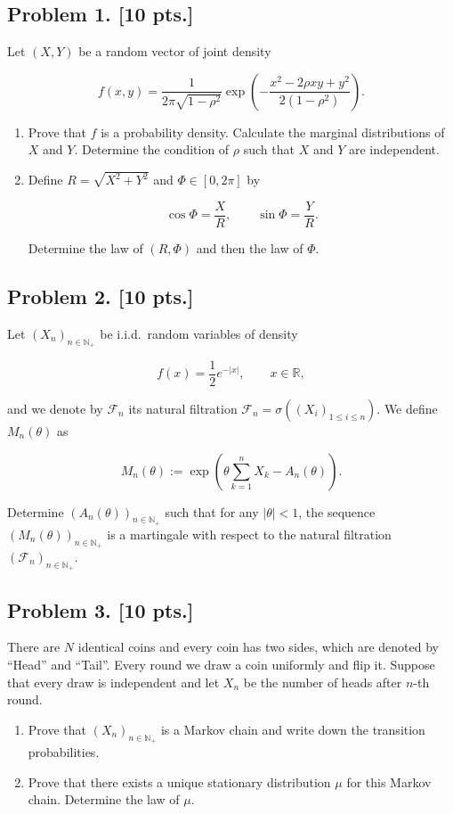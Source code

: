 \documentclass[11pt,a4paper]{article}
\begin{document}
\subsection{Problem 1. [10 pts.]}
Let \( (X, Y) \) be a random vector of joint density

\[
f(x, y) = \frac{1}{2\pi \sqrt{1 - \rho^2}} \exp\left( -\frac{x^2 - 2\rho xy + y^2}{2(1 - \rho^2)} \right).
\]

\begin{enumerate}[label=(\alph*)]
    \item Prove that \( f \) is a probability density. Calculate the marginal distributions of \( X \) and \( Y \). Determine the condition of \( \rho \) such that \( X \) and \( Y \) are independent.
    \item Define \( R = \sqrt{X^2 + Y^2} \) and \( \Phi \in [0, 2\pi] \) by

    \[
    \cos \Phi = \frac{X}{R}, \qquad \sin \Phi = \frac{Y}{R}.
    \]

    Determine the law of \( (R, \Phi) \) and then the law of \( \Phi \).
\end{enumerate}

\subsection{Problem 2. [10 pts.]}
Let \( (X_n)_{n \in \mathbb{N}_+} \) be i.i.d.\ random variables of density

\[
f(x) = \frac{1}{2} e^{-|x|}, \qquad x \in \mathbb{R},
\]

and we denote by \( \mathcal{F}_n \) its natural filtration \( \mathcal{F}_n = \sigma((X_i)_{1 \le i \le n}) \). We define \( M_n(\theta) \) as

\[
M_n(\theta) := \exp\left( \theta \sum_{k=1}^n X_k - A_n(\theta) \right).
\]

Determine \( (A_n(\theta))_{n \in \mathbb{N}_+} \) such that for any \( |\theta| < 1 \), the sequence \( (M_n(\theta))_{n \in \mathbb{N}_+} \) is a martingale with respect to the natural filtration \( (\mathcal{F}_n)_{n \in \mathbb{N}_+} \).

\subsection{Problem 3. [10 pts.]}
There are \( N \) identical coins and every coin has two sides, which are denoted by ``Head'' and ``Tail''. Every round we draw a coin uniformly and flip it. Suppose that every draw is independent and let \( X_n \) be the number of heads after \( n \)-th round.
\begin{enumerate}[label=(\alph*)]
    \item Prove that \( (X_n)_{n \in \mathbb{N}_+} \) is a Markov chain and write down the transition probabilities.
    \item Prove that there exists a unique stationary distribution \( \mu \) for this Markov chain. Determine the law of \( \mu \).
\end{enumerate}
\end{document}
